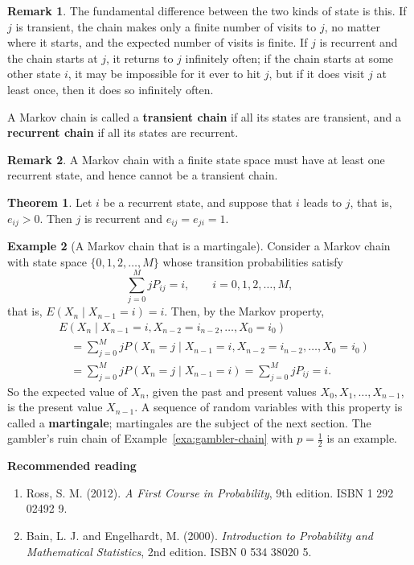 \documentclass[11pt,a4paper]{article}
\theoremstyle{definition}
\newtheorem{thm}{Theorem}[subsection]
\newtheorem{exa}[thm]{Example}
\newtheorem*{remark}{Remark}
\newcommand{\subhead}[1]{%
  \par\medskip\noindent\textbf{#1}\par\nobreak\smallskip}
\begin{document}
\begin{remark}
The fundamental difference between the two kinds of state is this. If $j$ is transient, the chain makes only a finite number of visits to $j$, no matter
where it starts, and the expected number of visits is finite. If $j$ is recurrent and the chain starts at $j$, it returns to $j$ infinitely often; if the chain
starts at some other state $i$, it may be impossible for it ever to hit $j$, but if it does visit $j$ at least once, then it does so infinitely often.

A Markov chain is called a \textbf{transient chain} if all its states are transient, and a \textbf{recurrent chain} if all its states are recurrent.
\end{remark}

\begin{remark}
A Markov chain with a finite state space must have at least one recurrent state, and hence cannot be a transient chain.
\end{remark}

\begin{thm}
Let $i$ be a recurrent state, and suppose that $i$ leads to $j$, that is, $e_{ij} > 0$. Then $j$ is recurrent and $e_{ij} = e_{ji} = 1$.
\end{thm}

\begin{exa}[A Markov chain that is a martingale]
Consider a Markov chain with state space $\{0, 1, 2, \dots, M\}$ whose transition probabilities satisfy
\[
\sum_{j=0}^MjP_{ij} = i , \qquad i = 0, 1, 2, \dots, M ,
\]
that is, $E(X_n \mid X_{n-1} = i) = i$. Then, by the Markov property,
\begin{align*}
&E(X_n \mid X_{n-1} = i, X_{n-2} = i_{n-2}, \dots, X_0 = i_0) \\
&\quad= \sum_{j=0}^MjP(X_n = j \mid X_{n-1} = i, X_{n-2} = i_{n-2}, \dots, X_0 = i_0) \\
&\quad= \sum_{j=0}^MjP(X_n = j \mid X_{n-1} = i) = \sum_{j=0}^MjP_{ij} = i .
\end{align*}
So the expected value of $X_n$, given the past and present values $X_0, X_1, \dots, X_{n-1}$, is the present value $X_{n-1}$. A sequence of random
variables with this property is called a \textbf{martingale}; martingales are the subject of the next section. The gambler's ruin chain of
Example~\ref{exa:gambler-chain} with $p = \frac12$ is an example.
\end{exa}

\subhead{Recommended reading}
\begin{enumerate}
\item Ross, S. M. (2012). \emph{A First Course in Probability}, 9th edition. ISBN 1 292 02492 9.
\item Bain, L. J. and Engelhardt, M. (2000). \emph{Introduction to Probability and Mathematical Statistics}, 2nd edition. ISBN 0 534 38020 5.
\end{enumerate}
\end{document}
